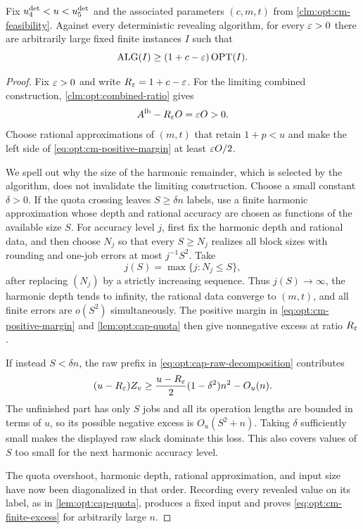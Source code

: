 \begin{claim}
\label{clm:opt:cm-finite-instances}
Fix $u_{4}^{\mathrm{det}}<u<u_{5}^{\mathrm{det}}$ and the associated parameters $(c,m,t)$ from
\cref{clm:opt:cm-feasibility}.  Against every deterministic revealing
algorithm, for every $\varepsilon>0$ there are arbitrarily large fixed finite
instances $I$ such that
\begin{equation}
 \operatorname{ALG}(I)\ge(1+c-\varepsilon)\operatorname{OPT}(I).
 \label{eq:opt:cm-finite-excess}
\end{equation}
\end{claim}

\begin{proof}
Fix $\varepsilon>0$ and write $R_\varepsilon=1+c-\varepsilon$.  For the limiting combined
construction, \cref{clm:opt:combined-ratio} gives
\begin{equation}
 A^{\rm lb}-R_\varepsilon O=\varepsilon O>0.
 \label{eq:opt:cm-positive-margin}
\end{equation}
Choose rational approximations of $(m,t)$ that retain $1+p<u$ and make the
left side of \cref{eq:opt:cm-positive-margin} at least $\varepsilon O/2$.

We spell out why the size of the harmonic remainder, which is selected by
the algorithm, does not invalidate the limiting construction.  Choose a
small constant $\delta>0$.  If the quota crossing leaves
$S\ge\delta n$ labels, use a finite harmonic approximation whose depth and
rational accuracy are chosen as functions of the available size $S$.
For accuracy level $j$, first fix the harmonic depth and rational data, and
then choose $N_j$ so that every $S\ge N_j$ realizes all block sizes with
rounding and one-job errors at most $j^{-1}S^2$.  Take
\[
 j(S)=\max\{j:N_j\le S\},
\]
after replacing $(N_j)$ by a strictly increasing sequence.  Thus
$j(S)\to\infty$, the harmonic depth tends to infinity, the rational data
converge to $(m,t)$, and all finite errors are $o(S^2)$ simultaneously.
The positive margin in \cref{eq:opt:cm-positive-margin} and
\cref{lem:opt:cap-quota} then give nonnegative excess at ratio $R_\varepsilon$.

If instead $S<\delta n$, the raw prefix in
\cref{eq:opt:cap-raw-decomposition} contributes
\[
 (u-R_\varepsilon)Z_v
 \ge \frac{u-R_\varepsilon}{2}(1-\delta^2)n^2-O_u(n).
\]
The unfinished part has only $S$ jobs and all its operation lengths are
bounded in terms of $u$, so its possible negative excess is
$O_u(S^2+n)$.  Taking $\delta$ sufficiently small makes the displayed raw
slack dominate this loss.  This also covers values of $S$ too small for the
next harmonic accuracy level.

The quota overshoot, harmonic depth, rational approximation, and input size
have now been diagonalized in that order.  Recording every revealed value
on its label, as in \cref{lem:opt:cap-quota}, produces a fixed input and
proves \cref{eq:opt:cm-finite-excess} for arbitrarily large $n$.
\end{proof}

